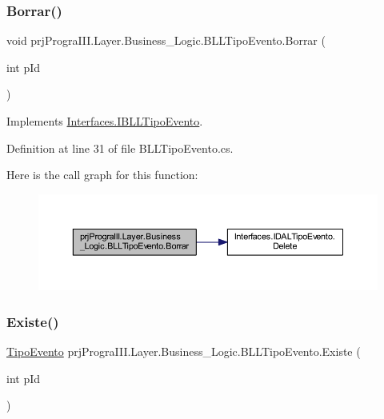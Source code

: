 \subsubsection{\texorpdfstring{Borrar()}{Borrar()}}
{\footnotesize\ttfamily void prj\+Progra\+I\+I\+I.\+Layer.\+Business\+\_\+\+Logic.\+B\+L\+L\+Tipo\+Evento.\+Borrar (\begin{DoxyParamCaption}\item[{int}]{p\+Id }\end{DoxyParamCaption})}



Implements \hyperlink{interface_interfaces_1_1_i_b_l_l_tipo_evento_a6ef15f72eee8239388905aed3c4d3ad5}{Interfaces.\+I\+B\+L\+L\+Tipo\+Evento}.



Definition at line 31 of file B\+L\+L\+Tipo\+Evento.\+cs.

Here is the call graph for this function\+:
\nopagebreak
\begin{figure}[H]
\begin{center}
\leavevmode
\includegraphics[width=350pt]{classprj_progra_i_i_i_1_1_layer_1_1_business___logic_1_1_b_l_l_tipo_evento_aaaccacb75f0020bbedee9a98c79d4899_cgraph}
\end{center}
\end{figure}
\hypertarget{classprj_progra_i_i_i_1_1_layer_1_1_business___logic_1_1_b_l_l_tipo_evento_a19a88b8e91a1e842f44708080b09f8c5}{}\label{classprj_progra_i_i_i_1_1_layer_1_1_business___logic_1_1_b_l_l_tipo_evento_a19a88b8e91a1e842f44708080b09f8c5} 
\subsubsection{\texorpdfstring{Existe()}{Existe()}}
{\footnotesize\ttfamily \hyperlink{classprj_progra_i_i_i_1_1_layer_1_1_entities_1_1_tipo_evento}{Tipo\+Evento} prj\+Progra\+I\+I\+I.\+Layer.\+Business\+\_\+\+Logic.\+B\+L\+L\+Tipo\+Evento.\+Existe (\begin{DoxyParamCaption}\item[{int}]{p\+Id }\end{DoxyParamCaption})}




